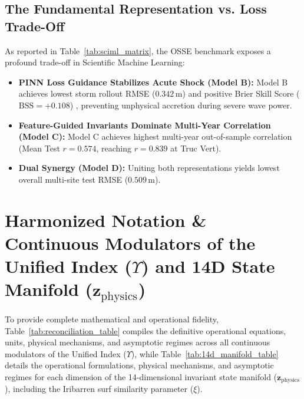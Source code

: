 \documentclass[journal]{IEEEtran}
\begin{document}
\subsection{The Fundamental Representation vs. Loss Trade-Off}
As reported in Table~\ref{tab:sciml_matrix}, the OSSE benchmark exposes a profound trade-off in Scientific Machine Learning:
\begin{itemize}
    \setlength{\itemsep}{0pt}\setlength{\parskip}{0pt}\setlength{\topsep}{1pt}
    \item \textbf{PINN Loss Guidance Stabilizes Acute Shock (Model B):} Model B achieves lowest storm rollout RMSE ($0.342\,\text{m}$) and positive Brier Skill Score ($\text{BSS} = +0.108$) \cite{sutherland2004evaluating}, preventing unphysical accretion during severe wave power.
    \item \textbf{Feature-Guided Invariants Dominate Multi-Year Correlation (Model C):} Model C achieves highest multi-year out-of-sample correlation (Mean Test $r = 0.574$, reaching $r = 0.839$ at Truc Vert).
    \item \textbf{Dual Synergy (Model D):} Uniting both representations yields lowest overall multi-site test RMSE ($0.509\,\text{m}$).
\end{itemize}

\section{Harmonized Notation \& Continuous Modulators of the Unified Index \texorpdfstring{($\Upsilon$)}{(Upsilon)} and 14D State Manifold \texorpdfstring{($\mathbf{z}_{\text{physics}}$)}{(z-physics)}}
\label{sec:appendix_modulators}

To provide complete mathematical and operational fidelity, Table~\ref{tab:reconciliation_table} compiles the definitive operational equations, units, physical mechanisms, and asymptotic regimes across all continuous modulators of the Unified Index ($\Upsilon$), while Table~\ref{tab:14d_manifold_table} details the operational formulations, physical mechanisms, and asymptotic regimes for each dimension of the 14-dimensional invariant state manifold ($\mathbf{z}_{\text{physics}}$), including the Iribarren surf similarity parameter ($\xi$).
\end{document}
